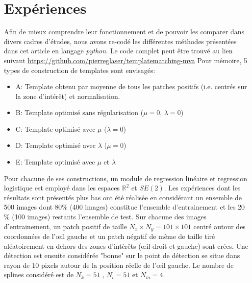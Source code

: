 \documentclass{article}
\begin{document}
\section{Expériences} \label{part:expe}

Afin de mieux comprendre leur fonctionnement et de pouvoir les comparer dans 
divers cadres d'études, nous avons re-codé les différentes méthodes présentées dans cet article 
en langage \textit{python}. Le code complet peut être trouvé au lien suivant  \url{https://github.com/pierreglaser/templatematching-mva}
Pour mémoire, 5 types de construction de templates sont envisagés:
\begin{itemize}
    \item A: Template obtenu par moyenne de tous les patches positifs (i.e. centrés sur la zone d'intérêt) et normalisation.
    \item B: Template optimisé sans régularisation ($\mu =0$, $\lambda = 0$)
    \item C: Template optimisé avec $\mu$ ($\lambda=0$)
    \item D: Template optimisé avec $\lambda$ ($\mu = 0$)
    \item E: Template optimisé avec $\mu$ et $\lambda$
\end{itemize}

Pour chacune de ses constructions, un module de regression linéaire et regression logistique est employé dans 
les espaces $\mathbb{R}^2$ et $SE(2)$. Les expériences dont les résultats sont présentés plus bas
ont été réalisée en considérant un ensemble de 500 images dont 80\% (400 images) constitue l'ensemble d'entrainement
et les 20 \% (100 images) restants l'ensemble de test.
Sur chacune des images d'entrainement, un patch 
positif de taille $N_x \times N_y = 101 \times 101$ centré autour des coordonnées de l'œil gauche et un patch négatif 
de même de taille tiré aléatoirement en dehors des zones d'intérêts (œil droit et gauche) sont crées. Une détection est 
ensuite considérée "bonne" sur le point de détection se situe dans rayon de $10$ pixels autour de la position réelle de l'œil 
gauche. Le nombre de splines considéré est de $N_k = 51$ , $N_l =51$ et $N_m = 4$.
\end{document}
